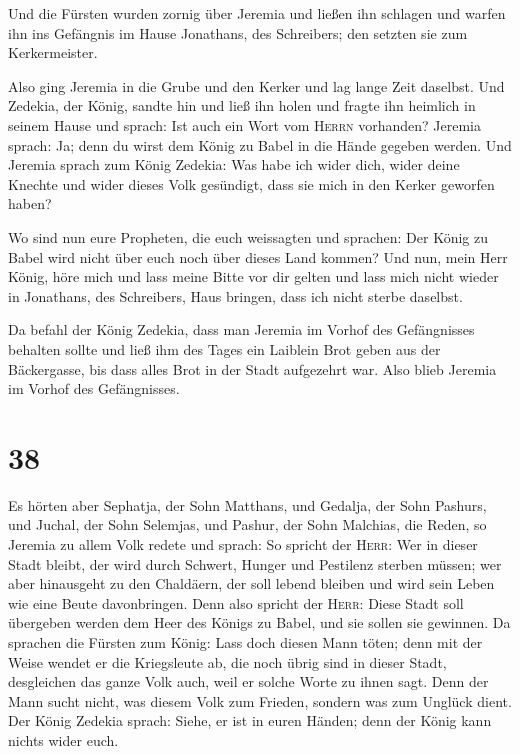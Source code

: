 Und die Fürsten wurden zornig über Jeremia und ließen
ihn schlagen und warfen ihn ins Gefängnis im Hause Jonathans, des
Schreibers; den setzten sie zum Kerkermeister.

 Also ging Jeremia in die Grube und den Kerker und lag
lange Zeit daselbst.  Und Zedekia, der König, sandte hin
und ließ ihn holen und fragte ihn heimlich in seinem Hause und sprach:
Ist auch ein Wort vom \textsc{Herrn} vorhanden? Jeremia sprach: Ja; denn
du wirst dem König zu Babel in die Hände gegeben werden. 
Und Jeremia sprach zum König Zedekia: Was habe ich wider dich, wider
deine Knechte und wider dieses Volk gesündigt, dass sie mich in den
Kerker geworfen haben?

 Wo sind nun eure Propheten, die euch weissagten und
sprachen: Der König zu Babel wird nicht über euch noch über dieses Land
kommen?  Und nun, mein Herr König, höre mich und lass
meine Bitte vor dir gelten und lass mich nicht wieder in Jonathans, des
Schreibers, Haus bringen, dass ich nicht sterbe daselbst.

 Da befahl der König Zedekia, dass man Jeremia im Vorhof
des Gefängnisses behalten sollte und ließ ihm des Tages ein Laiblein
Brot geben aus der Bäckergasse, bis dass alles Brot in der Stadt
aufgezehrt war. Also blieb Jeremia im Vorhof des Gefängnisses.

\hypertarget{section-37}{%
\section{38}\label{section-37}}

 Es hörten aber Sephatja, der Sohn Matthans, und Gedalja,
der Sohn Pashurs, und Juchal, der Sohn Selemjas, und Pashur, der Sohn
Malchias, die Reden, so Jeremia zu allem Volk redete und sprach:
 So spricht der \textsc{Herr}: Wer in dieser Stadt bleibt,
der wird durch Schwert, Hunger und Pestilenz sterben müssen; wer aber
hinausgeht zu den Chaldäern, der soll lebend bleiben und wird sein Leben
wie eine Beute davonbringen.  Denn also spricht der
\textsc{Herr}: Diese Stadt soll übergeben werden dem Heer des Königs zu
Babel, und sie sollen sie gewinnen.  Da sprachen die
Fürsten zum König: Lass doch diesen Mann töten; denn mit der Weise
wendet er die Kriegsleute ab, die noch übrig sind in dieser Stadt,
desgleichen das ganze Volk auch, weil er solche Worte zu ihnen sagt.
Denn der Mann sucht nicht, was diesem Volk zum Frieden, sondern was zum
Unglück dient.  Der König Zedekia sprach: Siehe, er ist in
euren Händen; denn der König kann nichts wider euch.

